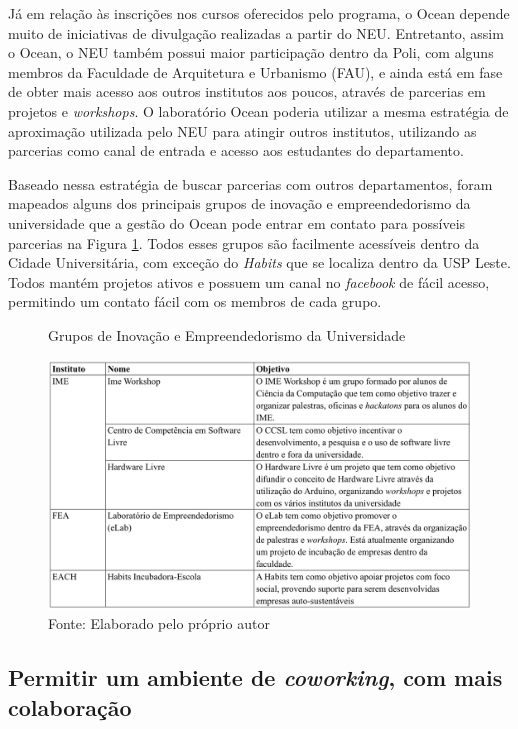 Já em relação às inscrições nos cursos oferecidos pelo programa, o Ocean depende muito de iniciativas de divulgação realizadas a partir do NEU. Entretanto, assim o Ocean, o NEU também possui maior participação dentro da Poli, com alguns membros da Faculdade de Arquitetura e Urbanismo (FAU), e ainda está em fase de obter mais acesso aos outros institutos aos poucos, através de parcerias em projetos e \textit{workshops}. O laboratório Ocean poderia utilizar a mesma estratégia de aproximação utilizada pelo NEU para atingir outros institutos, utilizando as parcerias como canal de entrada e acesso aos estudantes do departamento.

Baseado nessa estratégia de buscar parcerias com outros departamentos, foram mapeados alguns dos principais grupos de inovação e empreendedorismo da universidade que a gestão do Ocean pode entrar em contato para possíveis parcerias na Figura \ref{fig:institutosuniversidade}. Todos esses grupos são facilmente acessíveis dentro da Cidade Universitária, com exceção do \textit{Habits} que se localiza dentro da USP Leste. Todos mantém projetos ativos e possuem um canal no \textit{facebook} de fácil acesso, permitindo um contato fácil com os membros de cada grupo.

\begin{figure}[H]
\caption{Grupos de Inovação e Empreendedorismo da Universidade}
\centerline{\includegraphics[scale=0.6]{img/institutosuniversidade}}
\label{fig:institutosuniversidade}
\caption* {Fonte: Elaborado pelo próprio autor}
\end{figure}

\subsection{Permitir um ambiente de \textit{coworking}, com mais colaboração}

